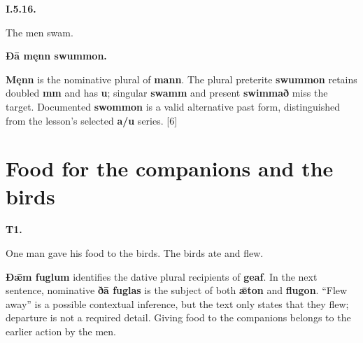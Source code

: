 \par\begin{minipage}{\linewidth}\raggedright
\textbf{I.5.16.}

The men swam.

\textbf{Ðā męnn swummon.}

\textbf{Męnn} is the nominative plural of \textbf{mann}. The plural preterite \textbf{swummon} retains doubled \textbf{mm} and has \textbf{u}; singular \textbf{swamm} and present \textbf{swimmað} miss the target. Documented \textbf{swommon} is a valid alternative past form, distinguished from the lesson's selected \textbf{a/\allowbreak{}u} series. [6]

\end{minipage}\par\addvspace{4pt}

\section*{Food for the companions and the birds}

\par\begin{minipage}{\linewidth}\raggedright
\textbf{T1.}

One man gave his food to the birds. The birds ate and flew.

\textbf{Ðǣm fuglum} identifies the dative plural recipients of \textbf{geaf}. In the next sentence, nominative \textbf{ðā fuglas} is the subject of both \textbf{ǣton} and \textbf{flugon}. “Flew away” is a possible contextual inference, but the text only states that they flew; departure is not a required detail. Giving food to the companions belongs to the earlier action by the men.

\end{minipage}\par\addvspace{4pt}

